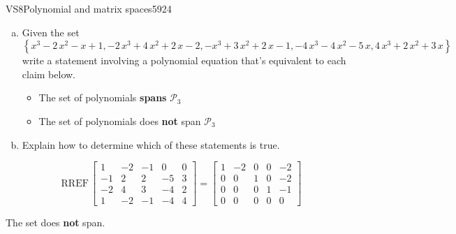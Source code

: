 \begin{exercise}{VS8}{Polynomial and matrix spaces}{5924} 
\begin{exerciseStatement} 

\begin{enumerate}[(a)]
\item  

 Given the set \[\left\{ x^{3} - 2 \, x^{2} - x + 1 , -2 \, x^{3} + 4 \, x^{2} + 2 \, x - 2 , -x^{3} + 3 \, x^{2} + 2 \, x - 1 , -4 \, x^{3} - 4 \, x^{2} - 5 \, x , 4 \, x^{3} + 2 \, x^{2} + 3 \, x \right\}\] write a statement involving a polynomial equation that's equivalent to each claim below. 

 

\begin{itemize}
\item  

 The set of polynomials \textbf{spans} \(\mathcal{P}_3\) 

 
\item  

 The set of polynomials does \textbf{not} span \(\mathcal{P}_3\) 

 
\end{itemize}

     
\item  

 Explain how to determine which of these statements is true. 

 
\end{enumerate}

     \end{exerciseStatement}
 \begin{exerciseAnswer} 

 \[
\mathrm{RREF}\, \left[\begin{array}{ccccc}
1 & -2 & -1 & 0 & 0 \\
-1 & 2 & 2 & -5 & 3 \\
-2 & 4 & 3 & -4 & 2 \\
1 & -2 & -1 & -4 & 4
\end{array}\right] = \left[\begin{array}{ccccc}
1 & -2 & 0 & 0 & -2 \\
0 & 0 & 1 & 0 & -2 \\
0 & 0 & 0 & 1 & -1 \\
0 & 0 & 0 & 0 & 0
\end{array}\right]
            \] 

 

 The set does \textbf{not} span. 

 \end{exerciseAnswer}
 \end{exercise}


